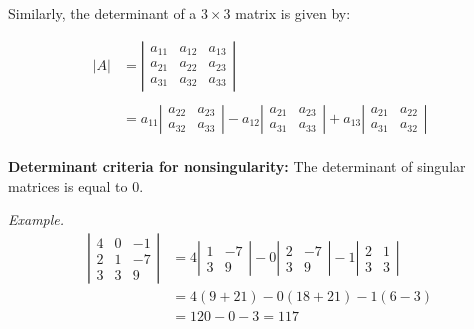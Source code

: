\documentclass{./../Latex/handout}
\begin{document}
 Similarly, the determinant of a $3 \times 3$ matrix is given by:

 $$
\begin{aligned}
|A| &=\left|\begin{array}{lll}
a_{11} & a_{12} & a_{13} \\
a_{21} & a_{22} & a_{23} \\
a_{31} & a_{32} & a_{33}
\end{array}\right| \\~\\
&=a_{11}\left|\begin{array}{ll}
a_{22} & a_{23} \\
a_{32} & a_{33}
\end{array}\right|-a_{12}\left|\begin{array}{ll}
a_{21} & a_{23} \\
a_{31} & a_{33}
\end{array}\right| 
+a_{13}\left|\begin{array}{ll}
a_{21} & a_{22} \\
a_{31} & a_{32}
\end{array}\right|
\end{aligned}
$$ \\

\textbf{Determinant criteria for nonsingularity:} {The determinant of singular matrices is equal to 0. }\ 

\textit{Example.}
$$
\begin{aligned}
\left|\begin{array}{ccc}
4 & 0 & -1 \\
2 & 1 & -7 \\
3 & 3 & 9
\end{array}\right| &=4\left|\begin{array}{rr}
1 & -7 \\
3 & 9
\end{array}\right|-0\left|\begin{array}{cc}
2 & -7 \\
3 & 9
\end{array}\right|-1\left|\begin{array}{ll}
2 & 1 \\
3 & 3
\end{array}\right| \\
&=4(9+21)-0(18+21)-1(6-3) \\
&=120-0-3=117
\end{aligned}
$$
\end{document}
